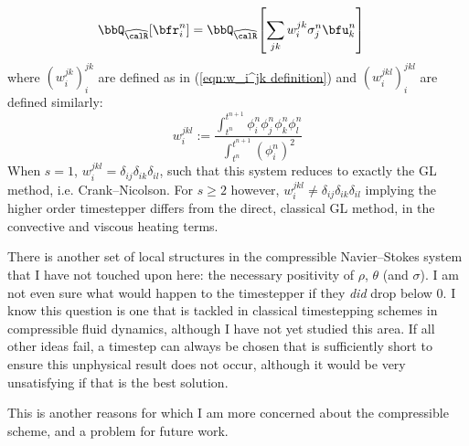 \begin{example}
\begin{align}
                \bbQ_{\widehat{\calR}}\!\left[\bfr_{i}^{n}\right]
                &=
                \bbQ_{\widehat{\calR}}\!\left[\sum_{jk}w_{i}^{jk}\sigma_{j}^{n}\bfu_{k}^{n}\right]
        \end{align}
        where $\left(w_{i}^{jk}\right)_{i}^{jk}$ are defined as in (\ref{eqn:w_i^jk definition}) and $\left(w_{i}^{jkl}\right)_{i}^{jkl}$ are defined similarly:
        \begin{equation}
            w_{i}^{jkl}  :=  \frac{\int_{t^{n}}^{t^{n + 1}}\phi^{n}_{i}\phi^{n}_{j}\phi^{n}_{k}\phi^{n}_{l}}{\int_{t^{n}}^{t^{n + 1}}(\phi^{n}_{i})^{2}}
        \end{equation}
        When $s = 1$, $w_{i}^{jkl} = \delta_{ij}\delta_{ik}\delta_{il}$, such that this system reduces to exactly the GL method, i.e. Crank--Nicolson. For $s \geq 2$ however, $w_{i}^{jkl} \neq \delta_{ij}\delta_{ik}\delta_{il}$ implying the higher order timestepper differs from the direct, classical GL method, in the convective and viscous heating terms.
    \end{example}

    \line

    \begin{remark}
        There is another set of local structures in the compressible Navier--Stokes system that I have not touched upon here: the necessary positivity of $\rho$, $\theta$ (and $\sigma$). I am not even sure what would happen to the timestepper if they \emph{did} drop below $0$. I know this question is one that is tackled in classical timestepping schemes in compressible fluid dynamics, although I have not yet studied this area. If all other ideas fail, a timestep can always be chosen that is sufficiently short to ensure this unphysical result does not occur, although it would be very unsatisfying if that is the best solution. 
        
        This is another reasons for which I am more concerned about the compressible scheme, and a problem for future work.
    \end{remark}
    